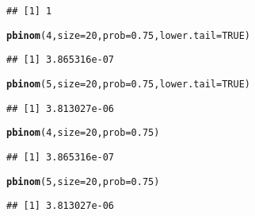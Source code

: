 \documentclass[12pt]{article}\usepackage[]{graphicx}\usepackage[]{color}
\makeatletter
\newcommand{\hlnum}[1]{\textcolor[rgb]{0.686,0.059,0.569}{#1}}%
\newcommand{\hlstd}[1]{\textcolor[rgb]{0.345,0.345,0.345}{#1}}%
\newcommand{\hlkwc}[1]{\textcolor[rgb]{0.333,0.667,0.333}{#1}}%
\newcommand{\hlkwd}[1]{\textcolor[rgb]{0.737,0.353,0.396}{\textbf{#1}}}%
\newenvironment{kframe}{%
 \def\at@end@of@kframe{}%
 \ifinner\ifhmode%
  \def\at@end@of@kframe{\end{minipage}}%
  \begin{minipage}{\columnwidth}%
 \fi\fi%
 \def\FrameCommand##1{\hskip\@totalleftmargin \hskip-\fboxsep
 \colorbox{shadecolor}{##1}\hskip-\fboxsep
     \hskip-\linewidth \hskip-\@totalleftmargin \hskip\columnwidth}%
 \MakeFramed {\advance\hsize-\width
   \@totalleftmargin\z@ \linewidth\hsize
   \@setminipage}}%
 {\par\unskip\endMakeFramed%
 \at@end@of@kframe}
\newenvironment{knitrout}{}{} %
\makeatother
\begin{document}
\begin{knitrout}
\begin{kframe}
\begin{verbatim}
## [1] 1
\end{verbatim}
\begin{alltt}
\hlkwd{pbinom}\hlstd{(}\hlnum{4}\hlstd{,}\hlkwc{size}\hlstd{=}\hlnum{20}\hlstd{,}\hlkwc{prob}\hlstd{=}\hlnum{0.75}\hlstd{,}\hlkwc{lower.tail} \hlstd{=} \hlnum{TRUE}\hlstd{)}
\end{alltt}
\begin{verbatim}
## [1] 3.865316e-07
\end{verbatim}
\begin{alltt}
\hlkwd{pbinom}\hlstd{(}\hlnum{5}\hlstd{,}\hlkwc{size}\hlstd{=}\hlnum{20}\hlstd{,}\hlkwc{prob}\hlstd{=}\hlnum{0.75}\hlstd{,}\hlkwc{lower.tail} \hlstd{=} \hlnum{TRUE}\hlstd{)}
\end{alltt}
\begin{verbatim}
## [1] 3.813027e-06
\end{verbatim}
\begin{alltt}
\hlkwd{pbinom}\hlstd{(}\hlnum{4}\hlstd{,}\hlkwc{size}\hlstd{=}\hlnum{20}\hlstd{,}\hlkwc{prob}\hlstd{=}\hlnum{0.75}\hlstd{)}
\end{alltt}
\begin{verbatim}
## [1] 3.865316e-07
\end{verbatim}
\begin{alltt}
\hlkwd{pbinom}\hlstd{(}\hlnum{5}\hlstd{,}\hlkwc{size}\hlstd{=}\hlnum{20}\hlstd{,}\hlkwc{prob}\hlstd{=}\hlnum{0.75}\hlstd{)}
\end{alltt}
\begin{verbatim}
## [1] 3.813027e-06
\end{verbatim}
\end{kframe}
\end{knitrout}
\end{document}
